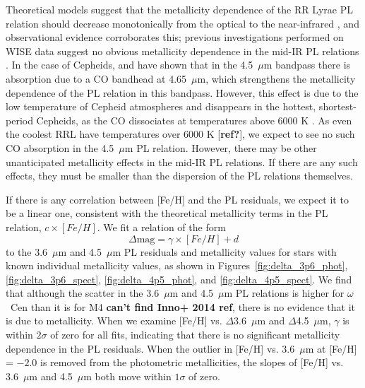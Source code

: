 \documentclass[a4paper,fleqn,usenatbib]{mnras}
\begin{document}

Theoretical models suggest that the metallicity dependence of the RR Lyrae PL relation should decrease monotonically from the optical to the near-infrared \citep{2004ApJS..154..633C, 2001MNRAS.326.1183B}, and observational evidence corroborates this; previous investigations performed on WISE data suggest no obvious metallicity dependence in the mid-IR PL relations \citep{2013ApJ...776..135M}. In the case of Cepheids, \citet{2011ApJ...743...76S} and \citet{2015arXiv150206995S} have shown that in the 4.5~$\mu$m bandpass there is absorption due to a CO bandhead at 4.65~$\mu$m, which strengthens the metallicity dependence of the PL relation in this bandpass. However, this effect is due to the low temperature of Cepheid atmospheres and disappears in the hottest, shortest-period Cepheids, as the CO dissociates at temperatures above 6000 K \citep{2012ApJ...759..146M}. As even the coolest RRL have temperatures over 6000 K [{\bf ref?}], we expect to see no such CO absorption in the 4.5~$\mu$m PL relation. However, there may be other unanticipated metallicity effects in the mid-IR PL relations. If there are any such effects, they must be smaller than the dispersion of the PL relations themselves.

If there is any correlation between [Fe/H] and the PL residuals, we expect it to be a linear one, consistent with the theoretical metallicity terms in the PL relation, $c\times[Fe/H]$. We fit a relation of the form
\begin{equation}
\Delta\text{mag} = \gamma \times[Fe/H] + d
\end{equation}
to the 3.6~$\mu$m and 4.5~$\mu$m PL residuals and metallicity values for stars with known individual metallicity values, as shown in Figures~\ref{fig:delta_3p6_phot}, \ref{fig:delta_3p6_spect}, \ref{fig:delta_4p5_phot}, and \ref{fig:delta_4p5_spect}. We find that although the scatter in the 3.6~$\mu$m and 4.5~$\mu$m PL relations is higher for $\omega$~Cen than it is for M4 \citep{2015arXiv150507858N} {\bf can't find Inno+ 2014 ref}, there is no evidence that it is due to metallicity. When we examine [Fe/H] vs. $\Delta$3.6~$\mu$m and $\Delta$4.5~$\mu$m, $\gamma$ is within $2\sigma$ of zero for all fits, indicating that there is no significant metallicity dependence in the PL residuals. When the outlier in [Fe/H] vs. 3.6~$\mu$m at [Fe/H] = $-2.0$ is removed from the photometric metallicities, the slopes of [Fe/H] vs. 3.6~$\mu$m and 4.5~$\mu$m both move within $1\sigma$ of zero.
\end{document}
